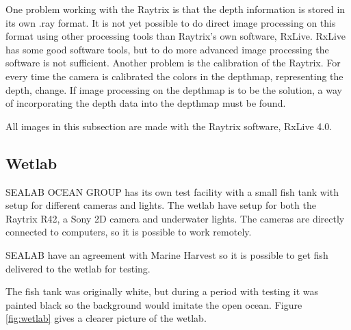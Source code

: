 One problem working with the Raytrix is that the depth information is stored in its own .ray format. It is not yet possible to do direct image processing on this format using other processing tools than Raytrix's own software, RxLive. RxLive has some good software tools, but to do more advanced image processing the software is not sufficient.
Another problem is the calibration of the Raytrix. For every time the camera is calibrated the colors in the depthmap, representing the depth, change. If image processing on the depthmap is to be the solution, a way of incorporating the depth data into the depthmap must be found.

All images in this subsection are made with the Raytrix software, RxLive 4.0.




\subsection{Wetlab}\label{wetlab}

SEALAB OCEAN GROUP has its own test facility with a small fish tank with setup for different cameras and lights. The wetlab have setup for both the Raytrix R42, a Sony 2D camera and underwater lights. The cameras are directly connected to computers, so it is possible to work remotely.

SEALAB have an agreement with Marine Harvest so it is possible to get fish delivered to the wetlab for testing.

The fish tank was originally white, but during a period with testing it was painted black so the background would imitate the open ocean. Figure \ref{fig:wetlab} gives a clearer picture of the wetlab.

